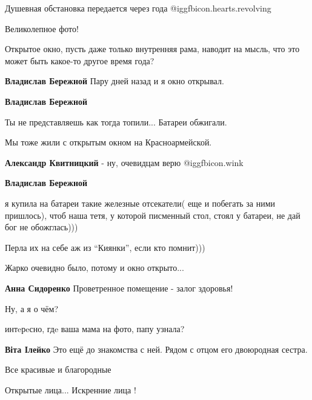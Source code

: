  
 
 
 
 

Душевная обстановка передается через года  @igg{fbicon.hearts.revolving} 

Великолепное фото!


Открытое окно, пусть даже только внутренняя рама, наводит на мысль, что это
может быть какое-то другое время года?

\textbf{Владислав Бережной} Пару дней назад и я окно открывал.

\textbf{Владислав Бережной} 

Ты не представляешь как тогда топили... Батареи обжигали.

Мы тоже жили с открытым окном на Красноармейской.

\textbf{Александр Квитницкий} - ну, очевидцам верю  @igg{fbicon.wink} 

\textbf{Владислав Бережной} 

я купила на батареи такие железные отсекатели( еще и побегать за ними
пришлось), чтоб наша тетя, у которой писменный стол, стоял у батареи, не дай
бог не обожглась)))

Перла их на себе аж из \enquote{Киянки}, если кто помнит)))

Жарко очевидно было, потому и окно открыто...

\textbf{Анна Сидоренко} Проветренное помещение - залог здоровья!

Ну, а я о чём?

интeрeсно, гдe ваша мама на фото, папу узнала?

\textbf{Віта Ілейко} Это ещё до знакомства с ней. Рядом с отцом его двоюродная сестра.

Все красивые и благородные

Открытые лица...
Искренние лица !
